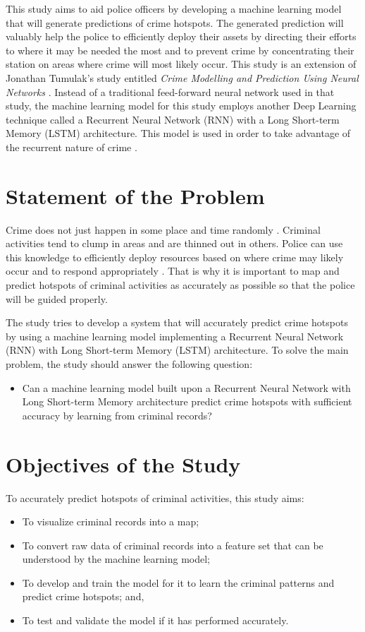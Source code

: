     This study aims to aid police officers by developing a machine learning model that will generate predictions of crime hotspots. The generated prediction will valuably help the police to efficiently deploy their assets by directing their efforts to where it may be needed the most and to prevent crime by concentrating their station on areas where crime will most likely occur. This study is an extension of Jonathan Tumulak's study entitled \textit{Crime Modelling and Prediction Using Neural Networks} \citeyearpar{tumulak2015crime}. Instead of a traditional feed-forward neural network used in that study, the machine learning model for this study employs another Deep Learning technique called a Recurrent Neural Network (RNN) with a Long Short-term Memory (LSTM) architecture. This model is used in order to take advantage of the recurrent nature of crime \citep{perc2013understanding}.

\section{Statement of the Problem} \label{section:statement-of-the-problem}
    Crime does not just happen in some place and time randomly \citep{brantingham2005modeling}. Criminal activities tend to clump in areas and are thinned out in others. Police can use this knowledge to efficiently deploy resources based on where crime may likely occur and to respond appropriately \citep{eck2005mapping}. That is why it is important to map and predict hotspots of criminal activities as accurately as possible so that the police will be guided properly.

    The study tries to develop a system that will accurately predict crime hotspots by using a machine learning model implementing a Recurrent Neural Network (RNN) with Long Short-term Memory (LSTM) architecture. To solve the main problem, the study should answer the following question:
        \begin{itemize}
        \item Can a machine learning model built upon a Recurrent Neural Network with Long Short-term Memory architecture predict crime hotspots with sufficient accuracy by learning from criminal records?
        \end{itemize}

\section{Objectives of the Study} \label{section:objectives-of-the-study}
    To accurately predict hotspots of criminal activities, this study aims:
        \begin{itemize}
        \item To visualize criminal records into a map;
        \item To convert raw data of criminal records into a feature set that can be understood by the machine learning model;
        \item To develop and train the model for it to learn the criminal patterns and predict crime hotspots; and,
        \item To test and validate the model if it has performed accurately.
        \end{itemize}


